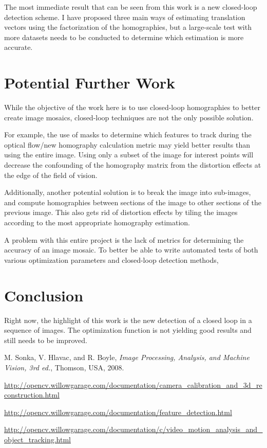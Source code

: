 \documentclass{article}
\begin{document}
The most immediate result that can be seen from this work is a new closed-loop
detection scheme. I have proposed three main ways of estimating translation
vectors using the factorization of the homographies, but a large-scale test
with more datasets needs to be conducted to determine which estimation is more
accurate. 

\section{Potential Further Work}
\label{sec:later}

While the objective of the work here is to use closed-loop homographies to
better create image mosaics, closed-loop techniques are not the only possible
solution. 

For example, the use of masks to determine which features to track
during the optical flow/new homography calculation metric may yield better
results than using the entire image. Using only a subset of the image for
interest points will decrease the confounding of the homography matrix from the
distortion effects at the edge of the field of vision.  

Additionally, another potential solution is to break the image into sub-images,
and compute homographies between sections of the image to other sections of the
previous image. This also gets rid of distortion effects by tiling the images
according to the most appropriate homography estimation. 

A problem with this entire project is the lack of metrics for determining the
accuracy of an image mosaic. To better be able to write automated tests of both
various optimization parameters and closed-loop detection methods, 

\section{Conclusion}

Right now, the highlight of this work is the new detection of a closed loop in
a sequence of images. The optimization function is not yielding good results
and still needs to be improved. 

\begin{thebibliography}{1}

 M. Sonka, V. Hlavac, and R. Boyle, \emph{Image Processing, Analysis, and Machine Vision, 3rd ed.}, Thomson, USA, 2008.

 \url{http://opencv.willowgarage.com/documentation/camera_calibration_and_3d_reconstruction.html}

 \url{http://opencv.willowgarage.com/documentation/feature_detection.html}

 \url{http://opencv.willowgarage.com/documentation/c/video_motion_analysis_and_object_tracking.html}

\end{thebibliography}
\end{document}

